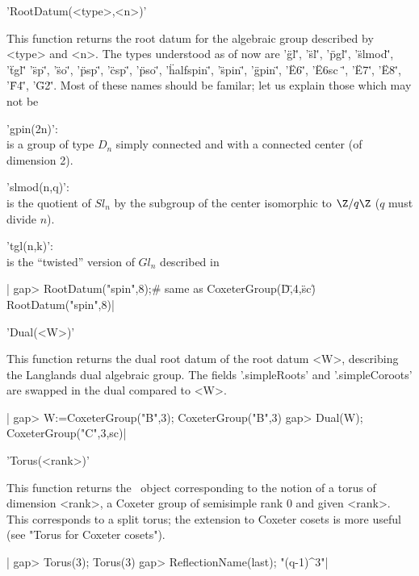 
'RootDatum(<type>,<n>)'

This  function returns the root datum  for the algebraic group described by
<type>  and <n>. The  types understood as  of now are\: '\"gl\"', '\"sl\"',
'\"pgl\"', '\"slmod\"', '\"tgl\"' '\"sp\"', '\"so\"', '\"psp\"', '\"csp\"',
'\"pso\"',  '\"halfspin\"', '\"spin\"', '\"gpin\"',  '\"E6\"', '\"E6sc \"',
'\"E7\"',  '\"E8\"',  '\"F4\"',  '\"G2\"'.  Most  of  these names should be
familar; let us explain those which may not be\:

'gpin(2n)':\\ is a group of type $D_n$ simply connected and with a connected
   center (of dimension 2).

'slmod(n,q)':\\ is the quotient of $Sl_n$ by the subgroup of the center
   isomorphic to $\Z/q\Z$ ($q$ must divide $n$).

'tgl(n,k)':\\ is the ``twisted'' version of $Gl_n$ described in 
   \cite[Example 5.17]{tay19}

|    gap> RootDatum("spin",8);# same as CoxeterGroup(\"D\",4,\"sc\")
    RootDatum("spin",8)|


'Dual(<W>)'

This function returns the dual root datum of the root datum <W>, describing
the   Langlands  dual  algebraic  group.   The  fields  '.simpleRoots'  and
'.simpleCoroots' are swapped in the dual compared to <W>.

|    gap> W:=CoxeterGroup("B",3);
    CoxeterGroup("B",3)
    gap> Dual(W);
    CoxeterGroup("C",3,sc)|


'Torus(<rank>)'

This  function returns the \CHEVIE\ object corresponding to the notion of a
torus  of dimension <rank>, a Coxeter group  of semisimple rank 0 and given
<rank>.  This corresponds to a split torus; the extension to Coxeter cosets
is more useful (see "Torus for Coxeter cosets").

|    gap> Torus(3);
    Torus(3)
    gap> ReflectionName(last);
    "(q-1)^3"|

